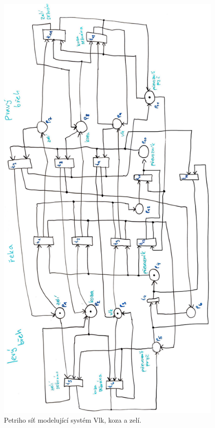 \documentclass[11pt, a4paper, titlepage]{article}
\begin{document}
\begin{figure}[H]
	\begin{center}
		\includegraphics[page=1,scale=0.3]{images/petri-net-fix-rotated.png}
		\caption{Petriho síť modelující systém Vlk, koza a zelí.}
		\label{petri-net}
	\end{center}
\end{figure}

\newpage

\end{document}
